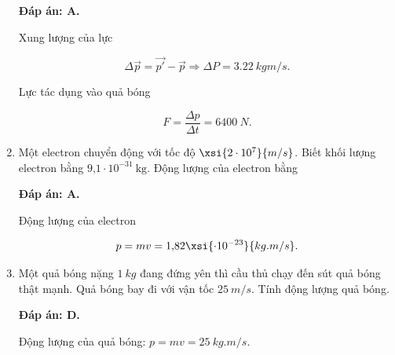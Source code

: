 \begin{enumerate}[label=\bfseries Câu \arabic*:]
	\hideall
	{	\textbf{Đáp án: A.}
		
		Xung lượng của lực
		
		$$\Delta \vec p = \vec {p'} - \vec p \Rightarrow \Delta P = \SI{3,22}{kgm/s}.$$
		
		Lực tác dụng vào quả bóng
		
		$$F = \dfrac{\Delta p}{\Delta t} = \SI{6400}{N}.$$
	}
	\item {}
	
	
	{
		Một electron chuyển động với tốc độ $\xsi{2\cdot 10^7}{m/s}$. Biết khối lượng electron bằng $\text{9,1} \cdot 10^{-31}\ \text{kg}.$ Động lượng của electron bằng
		
		
	}
	
	\hideall
	{	
		\textbf{Đáp án: A.}
		
		Động lượng của electron
		
		$$ p  = mv = \text{1,82}\xsi{\cdot 10^{-23}}{kg.m/s}.$$
	}
	\item {}
	
	
	{
		Một quả bóng nặng $\SI{1}{kg}$ đang đứng yên thì cầu thủ chạy đến sút quả bóng thật mạnh. Quả bóng bay đi với vận tốc $\SI{25}{m/s}$. Tính động lượng quả bóng.
	}
	
	\hideall
	{	
		\textbf{Đáp án: D.}
		
		Động lượng của quả bóng: $p=mv=\SI{25}{kg.m/s}$.
	}
\end{enumerate}
